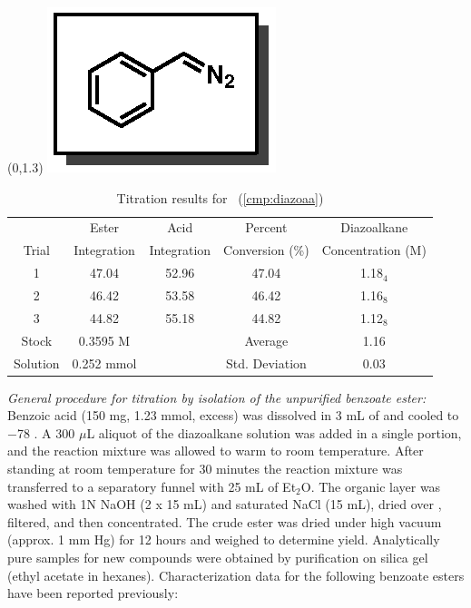\begin{singlespace}
\begin{table}[htbp]
\begin{textblock}{1}(0,1.3)
\includegraphics[scale=0.8]{chp_asymmetric/images/diazoaa}
\end{textblock}
\flushright
{\small
\begin{tabular}{ccccc} 
\toprule
&Ester&Acid&Percent&Diazoalkane\\
Trial&Integration&Integration&Conversion (\%)&Concentration (M) \\ 
\midrule
1 & 47.04 & 52.96 & 47.04 & 1.18$_4$ \\
2 & 46.42 & 53.58 & 46.42 & 1.16$_8$ \\
3 & 44.82 & 55.18 & 44.82 & 1.12$_8$ \\
\midrule
Stock & 0.3595 M & & Average & 1.16 \\
Solution & 0.252 mmol & & Std. Deviation & 0.03 \\
\bottomrule
\end{tabular}
\caption{Titration results for \CMPdiazoaa~(\ref{cmp:diazoaa})}
}
\end{table}
\end{singlespace}
\noindent \textit{General procedure for titration by isolation of the unpurified
benzoate ester:}
Benzoic acid (150 mg, 1.23 mmol, excess) was dissolved in 3 mL of 
and cooled to $-$78 \degc. A 300 $\mu$L aliquot of the diazoalkane solution was
added in a single portion, and the reaction mixture was allowed to warm to room
temperature. After standing at room temperature for 30 minutes the reaction
mixture was transferred to a separatory funnel with 25 mL of Et$_2$O. The
organic layer was washed with 1N NaOH (2 x 15 mL) and saturated NaCl (15 mL),
dried over , filtered, and then concentrated. The crude ester was
dried under high vacuum (approx. 1 mm Hg) for 12 hours and weighed to determine
yield. Analytically pure samples for new compounds were obtained by purification
on silica gel (ethyl acetate in hexanes). Characterization data for the
following benzoate esters have been reported previously:

